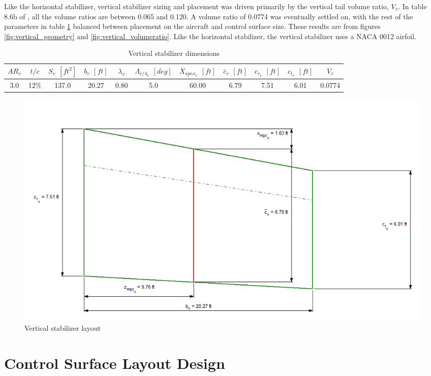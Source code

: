 \documentclass[conf]{new-aiaa}
\begin{document}
Like the horizontal stabilizer, vertical stabilizer sizing and placement was driven primarily by the vertical tail volume ratio, $V_v$. In table 8.6b of \cite{orange_book}, all the volume ratios are between 0.065 and 0.120. A volume ratio of 0.0774 was eventually settled on, with the rest of the parameters in table \ref{tab:vertical_stabilizer_size} balanced between placement on the aircraft and control surface size. These results are from figures \ref{fig:vertical_geometry} and \ref{fig:vertical_volumeratio}. Like the horizontal stabilizer, the vertical stabilizer uses a NACA 0012 airfoil.

\begin{table}[H]
\centering
\caption{Vertical stabilizer dimensions}
\begin{tabular}{|c|c|c|c|c|c|c|c|c|c|c|}\hline
    $AR_v$ & $t/c$ & $S_v$ $[ft^2]$ & $b_v$ $[ft]$ & $\lambda_v$ & $\Lambda_{c/4_v}$ $[deg]$ & $X_{apex_v}$ $[ft]$ & $\bar{c}_v$ $[ft]$ & $c_{r_v}$ $[ft]$ & $c_{t_v}$ $[ft]$ & $V_v$ \\ \hline
    3.0 & 12\% & 137.0 & 20.27 & 0.80 & 5.0  & 60.00 & 6.79 & 7.51 & 6.01 & 0.0774 \\ \hline
\end{tabular}
\label{tab:vertical_stabilizer_size}
\end{table}

\begin{figure}[H]
    \includegraphics[width=\textwidth]{Report3Printouts/Empannage/Vertical_geometry_plot.png}
    \caption{Vertical stabilizer layout}
    \label{fig:vertical_geometry_plot}
\end{figure}


\section{Control Surface Layout Design}
\end{document}
